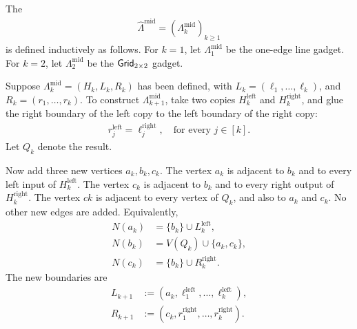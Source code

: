 \begin{definition}
\label{def:middle-all-connected-gadget}
The 
\begin{align}
    \hat\Lambda^{\mathrm{mid}}
    =
    (\Lambda^{\mathrm{mid}}_k)_{k\geq 1}
\end{align}
is defined inductively as follows. For \(k=1\), let
\(\Lambda^{\mathrm{mid}}_1\) be the one-edge line gadget. For \(k=2\), let
\(\Lambda^{\mathrm{mid}}_2\) be the $\mathsf{Grid}_{2 \times 2}$ gadget.

Suppose \(\Lambda^{\mathrm{mid}}_k=(H_k,L_k,R_k)\) has been defined, with
$
    L_k=(\ell_1,\ldots,\ell_k)
$, and $
    R_k=(r_1,\ldots,r_k)
$.
To construct \(\Lambda^{\mathrm{mid}}_{k+1}\), take two copies
\(H_k^{\mathrm{left}}\) and \(H_k^{\mathrm{right}}\), and glue the right
boundary of the left copy to the left boundary of the right copy:
\begin{align}
    r^{\mathrm{left}}_j
    =
    \ell^{\mathrm{right}}_j,
    \quad
    \text{for every } j\in[k].
\end{align}
Let \(Q_k\) denote the result.

Now add three new vertices \(a_k,b_k,c_k\). The vertex \(a_k\) is adjacent to
\(b_k\) and to every left input of \(H_k^{\mathrm{left}}\). The vertex
\(c_k\) is adjacent to \(b_k\) and to every right output of
\(H_k^{\mathrm{right}}\). The vertex \(ck\) is adjacent to every vertex of
\(Q_k\), and also to \(a_k\) and \(c_k\). No other new edges are added.
Equivalently,
\begin{align}
    N(a_k)
    &=
    \{b_k\}\cup L_k^{\mathrm{left}},\\
    N(b_k)
    &=
    V(Q_k)\cup\{a_k,c_k\},\\
    N(c_k)
    &=
    \{b_k\}\cup R_k^{\mathrm{right}}.
\end{align}
The new boundaries are
\begin{align}
    L_{k+1}
    &:=
    (a_k,\ell^{\mathrm{left}}_1,\ldots,\ell^{\mathrm{left}}_k),\\
    R_{k+1}
    &:=
    (c_k,r^{\mathrm{right}}_1,\ldots,r^{\mathrm{right}}_k).
\end{align}
\end{definition}



